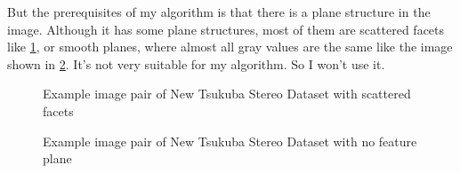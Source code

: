 But the prerequisites of my algorithm is that there is a plane structure in the image. Although it has some plane structures, most of them are scattered facets like \cref{fig:tsukuba_fluorescent_00313}, or smooth planes, where almost all gray values are the same like the image shown in \cref{fig:tsukuba_fluorescent_00566}. It's not very suitable for my algorithm. So I won't use it.
\begin{figure}[htbp]\centering
	\caption{Example image pair of New Tsukuba Stereo Dataset with scattered facets \cite{nakamuraOcclusionDetectableStereoocclusion1996}}
	\label{fig:tsukuba_fluorescent_00313}
\end{figure}
\begin{figure}[htbp]\centering
	\caption{Example image pair of New Tsukuba Stereo Dataset with no feature plane \cite{nakamuraOcclusionDetectableStereoocclusion1996}}
	\label{fig:tsukuba_fluorescent_00566}
\end{figure}

